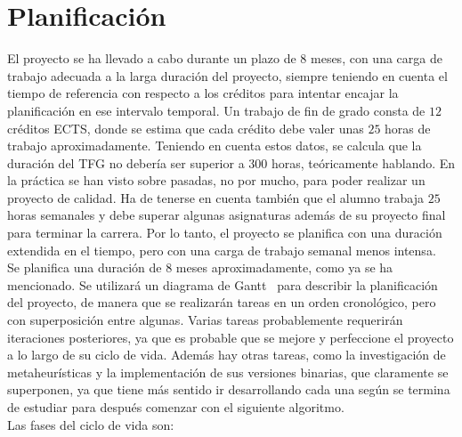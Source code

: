 \chapter{Planificación}
El proyecto se ha llevado a cabo durante un plazo de $8$ meses, con una carga de trabajo adecuada a la larga duración del proyecto, siempre teniendo en cuenta el tiempo de referencia con respecto a los créditos para intentar encajar la planificación en ese intervalo temporal.
Un trabajo de fin de grado consta de $12$ créditos ECTS, donde se estima que cada crédito debe valer unas $25$ horas de trabajo aproximadamente. Teniendo en cuenta estos datos, se calcula que la duración del TFG no debería ser superior a $300$ horas, teóricamente hablando. En la práctica se han visto sobre pasadas, no por mucho, para poder realizar un proyecto de calidad. Ha de tenerse en cuenta también que el alumno trabaja $25$ horas semanales y debe superar algunas asignaturas además de su proyecto final para terminar la carrera. Por lo tanto, el proyecto se planifica con una duración extendida en el tiempo, pero con una carga de trabajo semanal menos intensa.\\[6pt]
Se planifica una duración de $8$ meses aproximadamente, como ya se ha mencionado. Se utilizará un diagrama de Gantt~\cite{Clark1922} para describir la planificación del proyecto, de manera que se realizarán tareas en un orden cronológico, pero con superposición entre algunas. Varias tareas probablemente requerirán iteraciones posteriores, ya que es probable que se mejore y perfeccione el proyecto a lo largo de su ciclo de vida. Además hay otras tareas, como la investigación de metaheurísticas y la implementación de sus versiones binarias, que claramente se superponen, ya que tiene más sentido ir desarrollando cada una según se termina de estudiar para después comenzar con el siguiente algoritmo. \\[6pt]
Las fases del ciclo de vida son:
